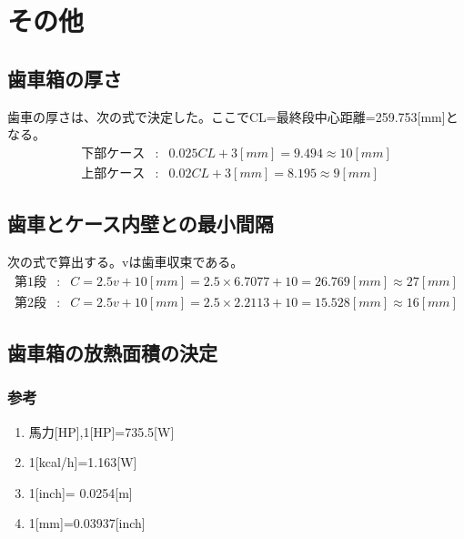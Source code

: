 \chapter{その他}
\section{歯車箱の厚さ}
歯車の厚さは、次の式で決定した。ここでCL=最終段中心距離=259.753[mm]となる。
\begin{eqnarray}
下部ケース&:&0.025CL + 3[mm] = 9.494 \approx 10[mm]\\
上部ケース&:&0.02CL + 3[mm] = 8.195 \approx 9[mm]
\end{eqnarray}
\section{歯車とケース内壁との最小間隔}
次の式で算出する。vは歯車収束である。
\begin{eqnarray}
第1段&:&C=2.5v+10[mm] =2.5 \times 6.7077 + 10 = 26.769[mm]  \approx 27[mm]\\
第2段&:&C=2.5v+10[mm] =2.5 \times 2.2113 + 10 = 15.528[mm] \approx 16[mm]
\end{eqnarray}
\section{歯車箱の放熱面積の決定}
\subsection{参考}
\begin{enumerate}
\item 馬力[HP],1[HP]=735.5[W]
\item 1[kcal/h]=1.163[W]
\item 1[inch]= 0.0254[m]
\item 1[mm]=0.03937[inch]
\end{enumerate}
